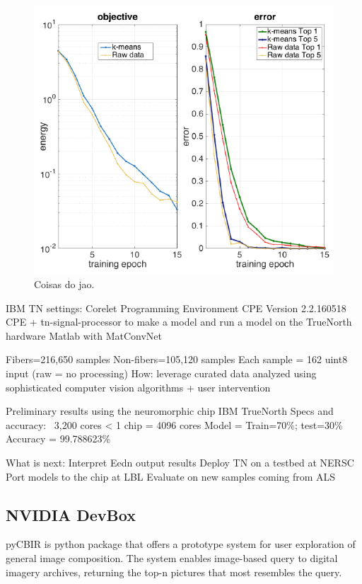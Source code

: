 \begin{figure}[h]
\centering
\includegraphics[width=\linewidth]{img/joao3.png}
\caption{Coisas do jao.}
\label{fig:cryem}
\end{figure}

IBM TN settings:
Corelet Programming Environment CPE Version 2.2.160518
CPE + tn-signal-processor to make a model
and run a model on the TrueNorth hardware
Matlab with MatConvNet

Fibers=216,650 samples
Non-fibers=105,120 samples
Each sample = 162 uint8 input (raw = no processing)
How: leverage curated data analyzed using sophisticated computer vision algorithms + user intervention

Preliminary results using the neuromorphic chip IBM TrueNorth
Specs and accuracy:
~3,200 cores < 1 chip = 4096 cores
Model =
Train=70\%; test=30\%
Accuracy = 99.788623\%

What is next:
Interpret Eedn output results
Deploy TN on a testbed at NERSC
Port models to the chip at LBL
Evaluate on new samples coming from ALS

\subsection{NVIDIA DevBox}

pyCBIR is python package that offers a prototype system for user exploration of general image composition. The system enables image-based query to digital imagery archives, returning the top-n pictures that most resembles the query.


